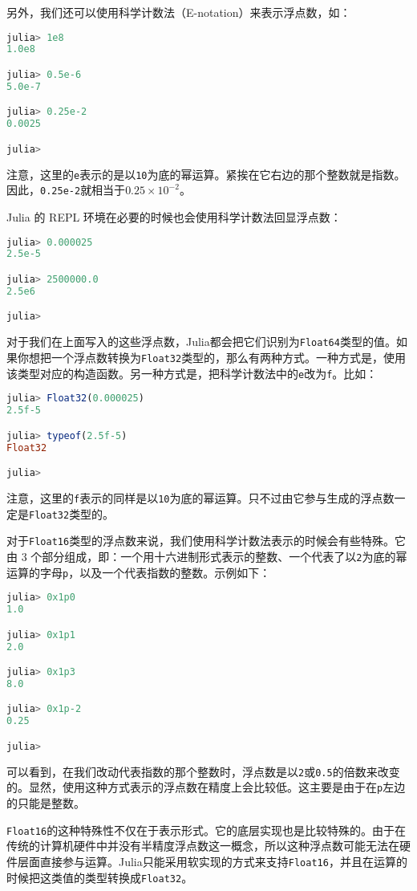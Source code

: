 另外，我们还可以使用科学计数法（E-notation）来表示浮点数，如：
\begin{lstlisting}[language=julia]
julia> 1e8
1.0e8

julia> 0.5e-6
5.0e-7

julia> 0.25e-2
0.0025

julia> 
\end{lstlisting}

注意，这里的\verb`e`表示的是以\verb`10`为底的幂运算。紧挨在它右边的那个整数就是指数。因此，\verb`0.25e-2`就相当于$0.25\times10^{-2}$。

Julia 的 REPL 环境在必要的时候也会使用科学计数法回显浮点数：
\begin{lstlisting}[language=julia]
julia> 0.000025
2.5e-5

julia> 2500000.0
2.5e6

julia> 
\end{lstlisting}

对于我们在上面写入的这些浮点数，Julia都会把它们识别为\verb`Float64`类型的值。如果你想把一个浮点数转换为\verb`Float32`类型的，那么有两种方式。一种方式是，使用该类型对应的构造函数。另一种方式是，把科学计数法中的\verb`e`改为\verb`f`。比如：
\begin{lstlisting}[language=julia]
julia> Float32(0.000025)
2.5f-5

julia> typeof(2.5f-5)
Float32

julia> 
\end{lstlisting}

注意，这里的\verb`f`表示的同样是以\verb`10`为底的幂运算。只不过由它参与生成的浮点数一定是\verb`Float32`类型的。

对于\verb`Float16`类型的浮点数来说，我们使用科学计数法表示的时候会有些特殊。它由 3 个部分组成，即：一个用十六进制形式表示的整数、一个代表了以\verb`2`为底的幂运算的字母\verb`p`，以及一个代表指数的整数。示例如下：
\begin{lstlisting}[language=julia]
julia> 0x1p0
1.0

julia> 0x1p1
2.0

julia> 0x1p3
8.0

julia> 0x1p-2
0.25

julia> 
\end{lstlisting}

可以看到，在我们改动代表指数的那个整数时，浮点数是以\verb`2`或\verb`0.5`的倍数来改变的。显然，使用这种方式表示的浮点数在精度上会比较低。这主要是由于在\verb`p`左边的只能是整数。

\verb`Float16`的这种特殊性不仅在于表示形式。它的底层实现也是比较特殊的。由于在传统的计算机硬件中并没有半精度浮点数这一概念，所以这种浮点数可能无法在硬件层面直接参与运算。Julia只能采用软实现的方式来支持\verb`Float16`，并且在运算的时候把这类值的类型转换成\verb`Float32`。

